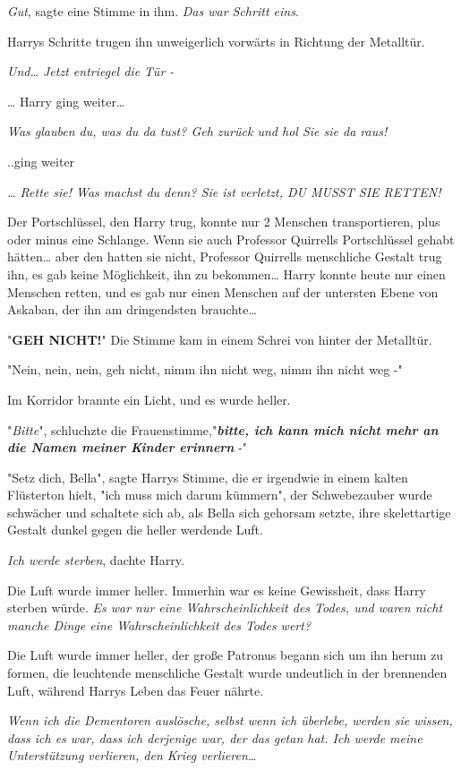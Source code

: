{\emph{Gut}, sagte eine Stimme in ihm. \emph{Das war Schritt eins}.

Harrys Schritte trugen ihn unweigerlich vorwärts in Richtung der Metalltür.

\emph{Und… Jetzt entriegel die Tür -}

… Harry ging weiter…

\emph{Was glauben du, was du da tust? Geh zurück und hol Sie sie da raus!}

..ging weiter

\emph{… Rette sie! Was machst du denn? Sie ist verletzt, DU MUSST SIE RETTEN!}

Der Portschlüssel, den Harry trug, konnte nur 2 Menschen transportieren, plus oder minus eine Schlange. Wenn sie auch Professor Quirrells Portschlüssel gehabt hätten… aber den hatten sie nicht, Professor Quirrells menschliche Gestalt trug ihn, es gab keine Möglichkeit, ihn zu bekommen… Harry konnte heute nur einen Menschen retten, und es gab nur einen Menschen auf der untersten Ebene von Askaban, der ihn am dringendsten brauchte…

"\textbf{GEH NICHT!}" Die Stimme kam in einem Schrei von hinter der Metalltür.

"Nein, nein, nein, geh nicht, nimm ihn nicht weg, nimm ihn nicht weg -"

Im Korridor brannte ein Licht, und es wurde heller.

"\emph{Bitte}", schluchzte die Frauenstimme,"\textbf{\emph{bitte, ich kann mich nicht mehr an die Namen meiner Kinder erinnern}} -"

"Setz dich, Bella", sagte Harrys Stimme, die er irgendwie in einem kalten Flüsterton hielt, "ich muss mich darum kümmern", der Schwebezauber wurde schwächer und schaltete sich ab, als Bella sich gehorsam setzte, ihre skelettartige Gestalt dunkel gegen die heller werdende Luft.

\emph{Ich werde sterben}, dachte Harry.

Die Luft wurde immer heller. Immerhin war es keine Gewissheit, dass Harry sterben würde. \emph{Es war nur eine Wahrscheinlichkeit des Todes, und waren nicht manche Dinge eine Wahrscheinlichkeit des Todes wert?}

Die Luft wurde immer heller, der große Patronus begann sich um ihn herum zu formen, die leuchtende menschliche Gestalt wurde undeutlich in der brennenden Luft, während Harrys Leben das Feuer nährte.

\emph{Wenn ich die Dementoren auslösche, selbst wenn ich überlebe, werden sie wissen, dass ich es war, dass ich derjenige war, der das getan hat. Ich werde meine Unterstützung verlieren, den Krieg verlieren…}

}
